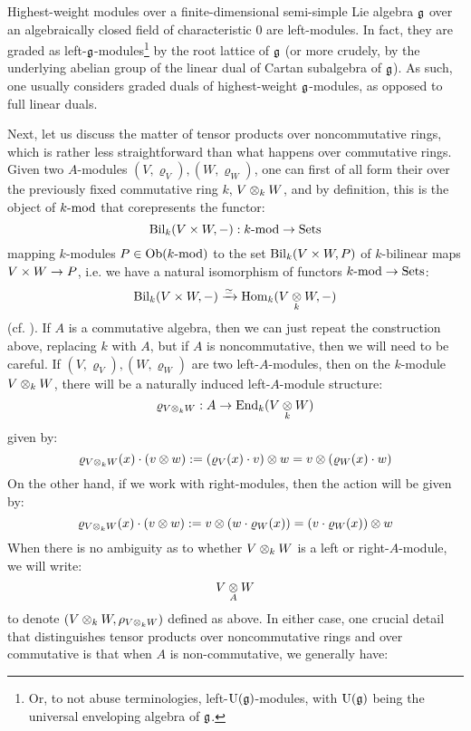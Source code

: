         \begin{example}
            Highest-weight modules over a finite-dimensional semi-simple Lie algebra $\g$ over an algebraically closed field of characteristic $0$ are left-modules. In fact, they are graded as left-$\g$-modules\footnote{Or, to not abuse terminologies, left-$\rmU(\g)$-modules, with $\rmU(\g)$ being the universal enveloping algebra of $\g$.} by the root lattice of $\g$ (or more crudely, by the underlying abelian group of the linear dual of  Cartan subalgebra of $\g$). As such, one usually considers graded duals of highest-weight $\g$-modules, as opposed to full linear duals.  
        \end{example}
        
        Next, let us discuss the matter of tensor products over noncommutative rings, which is rather less straightforward than what happens over commutative rings. Given two $A$-modules $(V, \varrho_V), (W, \varrho_W)$, one can first of all form their  over the previously fixed commutative ring $k$, $V \tensor_k W$, and by definition, this is the object of $k\mod$ that corepresents the functor:
            $$\Bil_k(V \x W, -): k\mod \to \Sets$$
        mapping $k$-modules $P \in \Ob(k\mod)$ to the set $\Bil_k(V \x W, P)$ of $k$-bilinear maps $V \x W \to P$, i.e. we have a natural isomorphism of functors $k\mod \to \Sets$:
            $$\Bil_k(V \x W, -) \xrightarrow[]{\cong} \Hom_k(V \tensor_k W, -)$$
        (cf. \cite[\href{https://stacks.math.columbia.edu/tag/00CX}{Tag 00CX}]{stacks-project}). If $A$ is a commutative algebra, then we can just repeat the construction above, replacing $k$ with $A$, but if $A$ is noncommutative, then we will need to be careful. If $(V, \varrho_V), (W, \varrho_W)$ are two left-$A$-modules, then on the $k$-module $V \tensor_k W$, there will be a naturally induced left-$A$-module structure:
            $$\varrho_{V \tensor_k W}: A \to \End_k(V \tensor_k W)$$
        given by:
            $$\varrho_{V \tensor_k W}(x) \cdot (v \tensor w) := (\varrho_V(x) \cdot v) \tensor w = v \tensor (\varrho_W(x) \cdot w)$$
        On the other hand, if we work with right-modules, then the action will be given by:
            $$\varrho_{V \tensor_k W}(x) \cdot (v \tensor w) := v \tensor (w \cdot \varrho_W(x)) = (v \cdot \varrho_W(x)) \tensor w$$
        When there is no ambiguity as to whether $V \tensor_k W$ is a left or right-$A$-module, we will write:
            $$V \tensor_A W$$
        to denote $(V \tensor_k W, \rho_{V \tensor_k W})$ defined as above. In either case, one crucial detail that distinguishes tensor products over noncommutative rings and over commutative is that when $A$ is non-commutative, we generally have:
